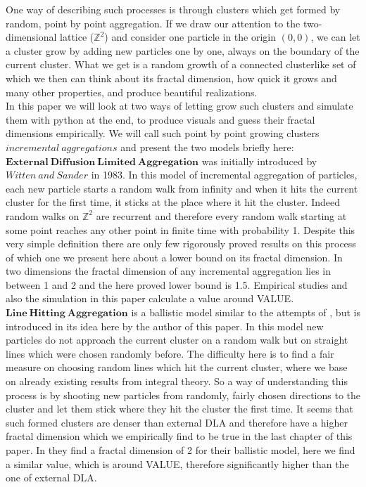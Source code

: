 \documentclass[12pt,a4paper]{scrartcl}
\numberwithin{equation}{subsection}
\newcommand{\Z}{\mathbb{Z}} %
\newcommand{\1}{\mathbbm{1}}
\numberwithin{equation}{section}
\theoremstyle{definition}
\begin{document}
	\noindent One way of describing such processes is through clusters which get formed by random, point by point aggregation. If we draw our attention to the two-dimensional lattice ($\Z^2$) and consider one particle in the origin $(0,0)$, we can let a cluster grow by adding new particles one by one, always on the boundary of the current cluster. What we get is a random growth of a connected clusterlike set of which we then can think about its fractal dimension, how quick it grows and many other properties, and produce beautiful realizations. \\
	
	\noindent In this paper we will look at two ways of letting grow such clusters and simulate them with python at the end, to produce visuals and guess their fractal dimensions empirically. We will call such point by point growing clusters $\mathit{incremental\ aggregations}$ and present the two models briefly here:\\

	\noindent $\mathbf{External\ Diffusion\ Limited\ Aggregation}$ was initially introduced by $\mathit{Witten\ and\ Sander}$ \cite{wittensander} in 1983. In this model of incremental aggregation of particles, each new particle starts a random walk from infinity and when it hits the current cluster for the first time, it sticks at the place where it hit the cluster. Indeed random walks on  $\Z^2$ are recurrent and therefore every random walk starting at some point reaches any other point in finite time with probability 1. Despite this very simple definition there are only few rigorously proved results on this process of which one we present here about a lower bound on its fractal dimension. In two dimensions the fractal dimension of any incremental aggregation lies in between 1 and 2 and the here proved lower bound is 1.5. Empirical studies and also the simulation in this paper calculate a value around VALUE.  \\
	
	\noindent $\mathbf{Line\ Hitting\ Aggregation}$ is a ballistic model similar to the attempts of \cite{ballistic}, but is introduced in its idea here by the author of this paper. In this model new particles do not approach the current cluster on a random walk but on straight lines which were chosen randomly before. The difficulty here is to find a fair measure on choosing random lines which hit the current cluster, where we base on already existing results from integral theory. So a way of understanding this process is by shooting new particles from randomly, fairly chosen directions to the cluster and let them stick where they hit the cluster the first time. It seems that such formed clusters are denser than external DLA and therefore have a higher fractal dimension which we empirically find to be true in the last chapter of this paper. In \cite{ballistic} they find a fractal dimension of 2 for their ballistic model, here we find a similar value, which is around VALUE, therefore significantly higher than the one of external DLA. \\
	
\end{document}
